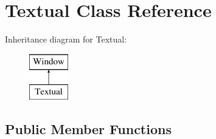 \hypertarget{classTextual}{\section{Textual Class Reference}
\label{de/da3/classTextual}
}
Inheritance diagram for Textual\-:\begin{figure}[H]
\begin{center}
\leavevmode
\includegraphics[height=2.000000cm]{de/da3/classTextual}
\end{center}
\end{figure}
\subsection*{Public Member Functions}
